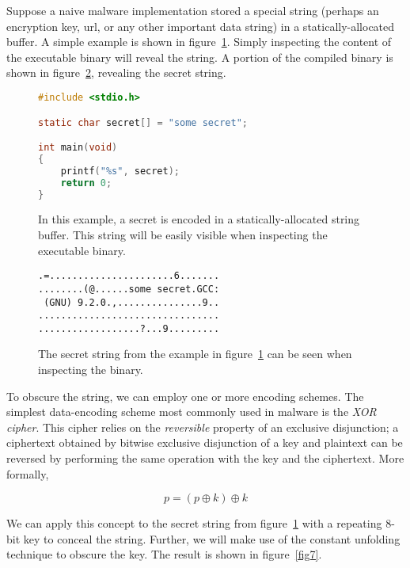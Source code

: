 \documentclass[conference]{IEEEtran}
\begin{document}
Suppose a naive malware implementation stored a special string (perhaps an encryption key, url, or any other important data string) in a statically-allocated buffer. A simple example is shown in figure~\ref{fig5}. Simply inspecting the content of the executable binary will reveal the string. A portion of the compiled binary is shown in figure~\ref{fig6}, revealing the secret string.

\begin{figure}[h]
\begin{lstlisting}[language=C,basicstyle=\footnotesize]
#include <stdio.h>

static char secret[] = "some secret";

int main(void)
{
	printf("%s", secret);
	return 0;
}
\end{lstlisting}
\caption{In this example, a secret is encoded in a statically-allocated string buffer. This string will be easily visible when inspecting the executable binary.}
\label{fig5}
\end{figure}

\begin{figure}[h]
\begin{lstlisting}[basicstyle=\footnotesize]
.=......................6.......
........(@......some secret.GCC:
 (GNU) 9.2.0.,...............9..
................................
..................?...9.........
\end{lstlisting}
\caption{The secret string from the example in figure~\ref{fig5} can be seen when inspecting the binary.}
\label{fig6}
\end{figure}

To obscure the string, we can employ one or more encoding schemes. The simplest data-encoding scheme most commonly used in malware is the \textit{XOR cipher}. This cipher relies on the \textit{reversible} property of an exclusive disjunction; a ciphertext obtained by bitwise exclusive disjunction of a key and plaintext can be reversed by performing the same operation with the key and the ciphertext. More formally, 

\begin{equation}
p = (p \oplus k) \oplus k
\end{equation}

We can apply this concept to the secret string from figure~\ref{fig5} with a repeating 8-bit key to conceal the string. Further, we will make use of the constant unfolding technique to obscure the key. The result is shown in figure~\ref{fig7}.
\end{document}
